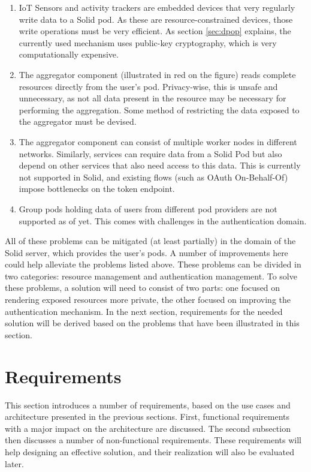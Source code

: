 \begin{enumerate}
    \item IoT Sensors and activity trackers are embedded devices that very regularly write data to a Solid pod. As these are resource-constrained devices, those write operations must be very efficient. As section \ref{sec:dpop} explains, the currently used mechanism uses public-key cryptography, which is very computationally expensive.
    \item The aggregator component (illustrated in red on the figure) reads complete resources directly from the user's pod. Privacy-wise, this is unsafe and unnecessary, as not all data present in the resource may be necessary for performing the aggregation. Some method of restricting the data exposed to the aggregator must be devised.
    \item The aggregator component can consist of multiple worker nodes in different networks. Similarly, services can require data from a Solid Pod but also depend on other services that also need access to this data. This is currently not supported in Solid, and existing flows (such as OAuth On-Behalf-Of) impose bottlenecks on the token endpoint. 
    \item Group pods holding data of users from different pod providers are not supported as of yet. This comes with challenges in the authentication domain.
\end{enumerate}

\noindent All of these problems can be mitigated (at least partially) in the domain of the Solid server, which provides the user's pods. A number of improvements here could help alleviate the problems listed above. These problems can be divided in two categories: resource management and authentication management. To solve these problems, a solution will need to consist of two parts: one focused on rendering exposed resources more private, the other focused on improving the authentication mechanism. In the next section, requirements for the needed solution will be derived based on the problems that have been illustrated in this section.

\section{Requirements}
\label{sec:requirements}
This section introduces a number of requirements, based on the use cases and architecture presented in the previous sections. First, functional requirements with a major impact on the architecture are discussed. The second subsection then discusses a number of non-functional requirements. These requirements will help designing an effective solution, and their realization will also be evaluated later.

